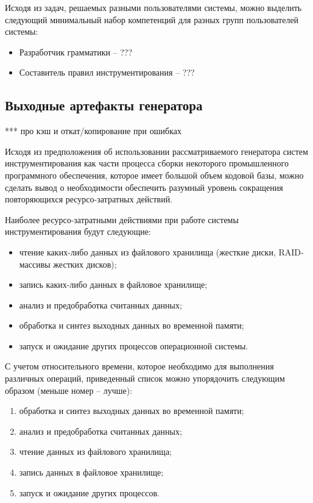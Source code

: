 Исходя из задач, решаемых разными пользователями системы, можно выделить следующий минимальный набор компетенций для разных групп пользователей системы:
\begin{itemize}
  \item Разработчик грамматики -- ???
  \item Составитель правил инструментирования -- ???
\end{itemize}


\subsection{Выходные артефакты генератора}

***
про кэш и откат/копирование при ошибках

Исходя из предположения об использовании рассматриваемого генератора систем инструментирования как части процесса сборки некоторого промышленного программного обеспечения, которое имеет большой объем кодовой базы, можно сделать вывод о необходимости обеспечить разумный уровень сокращения повторяющихся ресурсо-затратных действий.

Наиболее ресурсо-затратными действиями при работе системы инструментирования будут следующие:
\begin{itemize}
  \item чтение каких-либо данных из файлового хранилища (жесткие диски, RAID-массивы жестких дисков);
  \item запись каких-либо данных в файловое хранилище;
  \item анализ и предобработка считанных данных;
  \item обработка и синтез выходных данных во временной памяти;
  \item запуск и ожидание других процессов операционной системы.
\end{itemize}

С учетом относительного времени, которое необходимо для выполнения различных операций, приведенный список можно упорядочить следующим образом (меньше номер -- лучше):
\begin{enumerate}
  \item обработка и синтез выходных данных во временной памяти;
  \item анализ и предобработка считанных данных;
  \item чтение данных из файлового хранилища;
  \item запись данных в файловое хранилище;
  \item запуск и ожидание других процессов.
\end{enumerate}

